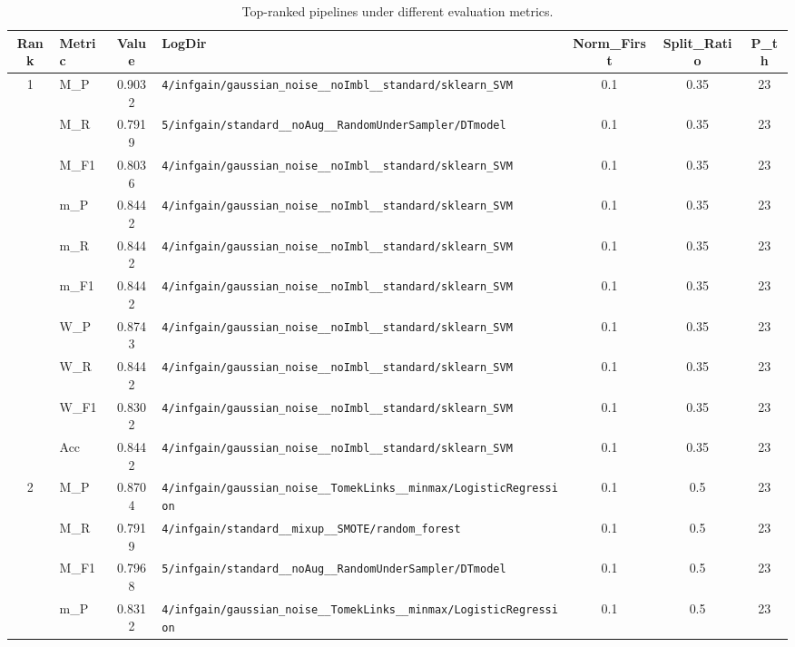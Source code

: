 \begin{table}[htbp]
\caption{Top-ranked pipelines under different evaluation metrics.}
\label{tab:rank_metric_vertical}
\centering
\small
\setlength{\tabcolsep}{4pt}
\begin{tabular}{|c|l|c|>{\ttfamily\footnotesize}p{7.2cm}|c|c|c|}
\hline
Rank & Metric & Value & LogDir & Norm\_First & Split\_Ratio & P\_th \\
\hline
\multirow{10}{*}{1} & M\_P & 0.9032 & \texttt{4/infgain/gaussian\_noise\_\_noImbl\_\_standard/sklearn\_SVM} & 0.1 & 0.35  & 23 \\ 
 & M\_R & 0.7919 & \texttt{5/infgain/standard\_\_noAug\_\_RandomUnderSampler/DTmodel} & 0.1 & 0.35  & 23 \\ 
 & M\_F1 & 0.8036 & \texttt{4/infgain/gaussian\_noise\_\_noImbl\_\_standard/sklearn\_SVM} & 0.1 & 0.35  & 23 \\ 
 & m\_P & 0.8442 & \texttt{4/infgain/gaussian\_noise\_\_noImbl\_\_standard/sklearn\_SVM} & 0.1 & 0.35  & 23 \\ 
 & m\_R & 0.8442 & \texttt{4/infgain/gaussian\_noise\_\_noImbl\_\_standard/sklearn\_SVM} & 0.1 & 0.35  & 23 \\ 
 & m\_F1 & 0.8442 & \texttt{4/infgain/gaussian\_noise\_\_noImbl\_\_standard/sklearn\_SVM} & 0.1 & 0.35  & 23 \\ 
 & W\_P & 0.8743 & \texttt{4/infgain/gaussian\_noise\_\_noImbl\_\_standard/sklearn\_SVM} & 0.1 & 0.35  & 23 \\ 
 & W\_R & 0.8442 & \texttt{4/infgain/gaussian\_noise\_\_noImbl\_\_standard/sklearn\_SVM} & 0.1 & 0.35  & 23 \\ 
 & W\_F1 & 0.8302 & \texttt{4/infgain/gaussian\_noise\_\_noImbl\_\_standard/sklearn\_SVM} & 0.1 & 0.35  & 23 \\ 
 & Acc & 0.8442 & \texttt{4/infgain/gaussian\_noise\_\_noImbl\_\_standard/sklearn\_SVM} & 0.1 & 0.35  & 23 \\ 
\hline
\multirow{10}{*}{2} & M\_P & 0.8704 & \texttt{4/infgain/gaussian\_noise\_\_TomekLinks\_\_minmax/LogisticRegression} & 0.1 & 0.5  & 23 \\ 
 & M\_R & 0.7919 & \texttt{4/infgain/standard\_\_mixup\_\_SMOTE/random\_forest} & 0.1 & 0.5  & 23 \\ 
 & M\_F1 & 0.7968 & \texttt{5/infgain/standard\_\_noAug\_\_RandomUnderSampler/DTmodel} & 0.1 & 0.5  & 23 \\ 
 & m\_P & 0.8312 & \texttt{4/infgain/gaussian\_noise\_\_TomekLinks\_\_minmax/LogisticRegression} & 0.1 & 0.5  & 23 \\ 

\end{tabular}
\end{table}
